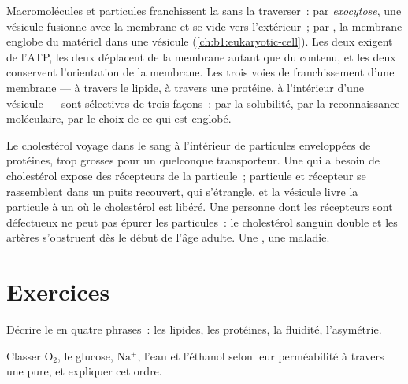 \begin{proposition}\label{prop:b1:membranes-transport:vesicles}
Macromolécules et particules franchissent la  sans la
traverser~: par \emph{exocytose}, une vésicule fusionne avec la membrane
et se vide vers l'extérieur~; par \emph{}, la membrane englobe
du matériel dans une vésicule (\cref{ch:b1:eukaryotic-cell}). Les deux
exigent de l'ATP, les deux déplacent de la membrane autant que du
contenu, et les deux conservent l'orientation de la membrane. Les trois
voies de franchissement d'une membrane --- à travers le lipide, à
travers une protéine, à l'intérieur d'une vésicule --- sont sélectives
de trois façons~: par la solubilité, par la reconnaissance moléculaire,
par le choix de ce qui est englobé.
\end{proposition}

\begin{example}\label{ex:b1:membranes-transport:ldl}
Le cholestérol voyage dans le sang à l'intérieur de particules
enveloppées de protéines, trop grosses pour un quelconque transporteur.
Une  qui a besoin de cholestérol expose des récepteurs de la
particule~; particule et récepteur se rassemblent dans un puits
recouvert, qui s'étrangle, et la vésicule livre la particule à un
 où le cholestérol est libéré. Une personne dont les récepteurs
sont défectueux ne peut pas épurer les particules~: le cholestérol
sanguin double et les artères s'obstruent dès le début de l'âge adulte.
Une , une maladie.
\end{example}

\section{Exercices}

\begin{exercise}[$\star$]\label{exo:b1:membranes-transport:1}
Décrire le  en quatre phrases~: les lipides,
les protéines, la fluidité, l'asymétrie.
\end{exercise}

\begin{exercise}[$\star$]\label{exo:b1:membranes-transport:2}
Classer $\mathrm{O_2}$, le glucose, $\mathrm{Na^+}$, l'eau et l'éthanol
selon leur perméabilité à travers une  pure, et
expliquer cet ordre.
\end{exercise}


